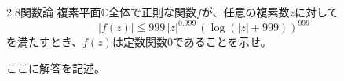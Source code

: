 \begin{prob}{2.8}{}{関数論}
複素平面$\mathbb{C}$全体で正則な関数$f$が、任意の複素数$z$に対して
\[
|f(z)|\leqq 999\,|z|^{0.999}\,(\log(|z|+999))^{999}
\]
を満たすとき、$f(z)$は定数関数$0$であることを示せ。
\end{prob}

ここに解答を記述。
